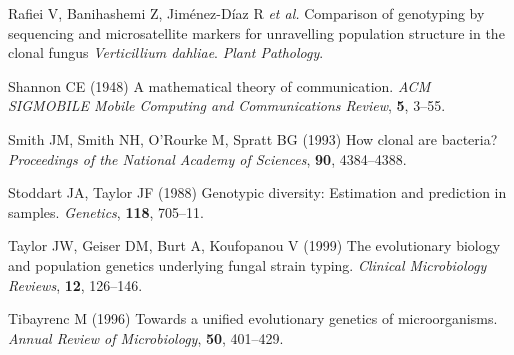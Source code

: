 \documentclass[]{article}
\theoremstyle{definition}
\theoremstyle{definition}
\theoremstyle{remark}
\begin{document}
\hypertarget{ref-rafiei2017comparison}{}
Rafiei V, Banihashemi Z, Jiménez-Díaz R \emph{et al.} Comparison of
genotyping by sequencing and microsatellite markers for unravelling
population structure in the clonal fungus \emph{Verticillium dahliae}.
\emph{Plant Pathology}.

\hypertarget{ref-shannon2001mathematical}{}
Shannon CE (1948) A mathematical theory of communication. \emph{ACM
SIGMOBILE Mobile Computing and Communications Review}, \textbf{5},
3--55.

\hypertarget{ref-smith1993how}{}
Smith JM, Smith NH, O'Rourke M, Spratt BG (1993) How clonal are
bacteria? \emph{Proceedings of the National Academy of Sciences},
\textbf{90}, 4384--4388.

\hypertarget{ref-stoddart1988genotypic}{}
Stoddart JA, Taylor JF (1988) Genotypic diversity: Estimation and
prediction in samples. \emph{Genetics}, \textbf{118}, 705--11.

\hypertarget{ref-taylor1999evolutionary}{}
Taylor JW, Geiser DM, Burt A, Koufopanou V (1999) The evolutionary
biology and population genetics underlying fungal strain typing.
\emph{Clinical Microbiology Reviews}, \textbf{12}, 126--146.

\hypertarget{ref-tibayrenc1996towards}{}
Tibayrenc M (1996) Towards a unified evolutionary genetics of
microorganisms. \emph{Annual Review of Microbiology}, \textbf{50},
401--429.
\end{document}
